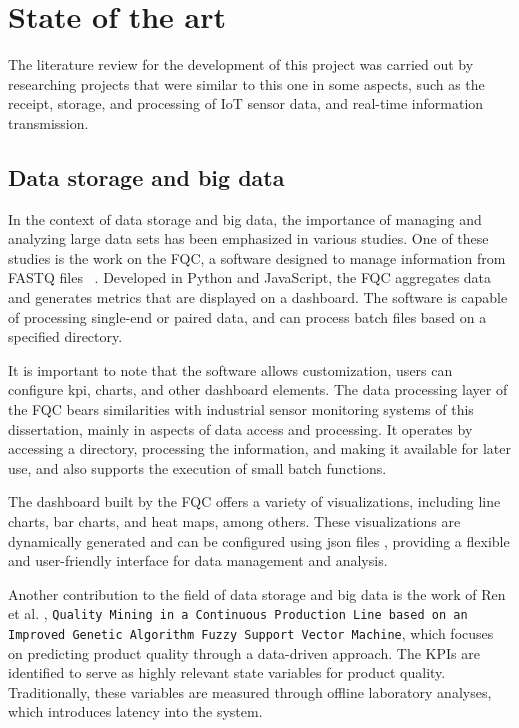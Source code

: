 \chapter{State of the art}\label{cap:conceptual}

The literature review for the development of this project was carried out by researching projects that were similar to this one in some aspects, such as the receipt, storage, and processing of \gls{IoT} sensor data, and real-time information transmission.

\section{Data storage and big data}

In the context of data storage and big data, the importance of managing and analyzing large data sets has been emphasized in various studies. One of these studies is the work on the \gls{FQC}, a software designed to manage information from FASTQ files ~\cite{fqc2017}. Developed in Python and JavaScript, the \gls{FQC} aggregates data and generates metrics that are displayed on a dashboard. The software is capable of processing single-end or paired data, and can process batch files based on a specified directory.

It is important to note that the software allows customization, users can configure \gls{kpi}, charts, and other dashboard elements. The data processing layer of the \gls{FQC} bears similarities with industrial sensor monitoring systems of this dissertation, mainly in aspects of data access and processing. It operates by accessing a directory, processing the information, and making it available for later use, and also supports the execution of small batch functions.

The dashboard built by the FQC offers a variety of visualizations, including line charts, bar charts, and heat maps, among others. These visualizations are dynamically generated and can be configured using \gls{json} files \cite{mdnJson}, providing a flexible and user-friendly interface for data management and analysis.

Another contribution to the field of data storage and big data is the work of Ren et al. \cite{ren2021data}, \texttt{Quality Mining in a Continuous Production Line based on an Improved Genetic Algorithm Fuzzy Support Vector Machine}, which focuses on predicting product quality through a data-driven approach. The \gls{KPIs} are identified to serve as highly relevant state variables for product quality. Traditionally, these variables are measured through offline laboratory analyses, which introduces latency into the system.

